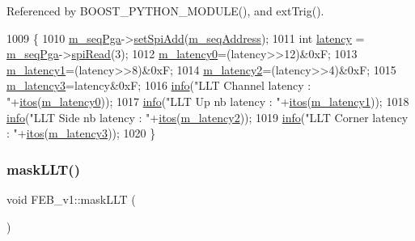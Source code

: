 Referenced by B\+O\+O\+S\+T\+\_\+\+P\+Y\+T\+H\+O\+N\+\_\+\+M\+O\+D\+U\+L\+E(), and ext\+Trig().


\begin{DoxyCode}
1009                        \{
1010   \hyperlink{classFEB__v1_a6c7804ac86796f233a8393043adf2e77}{m\_seqPga}->\hyperlink{classSeqPGA_ac998ce3a6d9b5f2e88cc8393f8c1df53}{setSpiAdd}(\hyperlink{classFEB__v1_a1c1eb093fd1733b9510fcf8bc5c7ad08}{m\_seqAddress});
1011   \textcolor{keywordtype}{int} \hyperlink{classFEB__v1_a68050d232efd8d6568910b09a2c18f62}{latency} = \hyperlink{classFEB__v1_a6c7804ac86796f233a8393043adf2e77}{m\_seqPga}->\hyperlink{classSeqPGA_ab3d0e5e5d4014bc7a92588a76b8713d4}{spiRead}(3);
1012   \hyperlink{classFEB__v1_a23a3d8bfbf96490890140f13b08a02c1}{m\_latency0}=(latency>>12)&0xF;
1013   \hyperlink{classFEB__v1_a026d2f4973bf3ddbc404e35264fdef1f}{m\_latency1}=(latency>>8)&0xF;
1014   \hyperlink{classFEB__v1_a2c4b18efd76de3bf7089bba57fb6744f}{m\_latency2}=(latency>>4)&0xF;
1015   \hyperlink{classFEB__v1_a2f71bdcef05c845177a62610da490bf9}{m\_latency3}=latency&0xF;
1016   \hyperlink{classObject_a644fd329ea4cb85f54fa6846484b84a8}{info}(\textcolor{stringliteral}{"LLT Channel latency : "}+\hyperlink{Tools_8h_af330027dbdafb9a30768b3613c553e60}{itos}(\hyperlink{classFEB__v1_a23a3d8bfbf96490890140f13b08a02c1}{m\_latency0}));
1017   \hyperlink{classObject_a644fd329ea4cb85f54fa6846484b84a8}{info}(\textcolor{stringliteral}{"LLT Up nb   latency : "}+\hyperlink{Tools_8h_af330027dbdafb9a30768b3613c553e60}{itos}(\hyperlink{classFEB__v1_a026d2f4973bf3ddbc404e35264fdef1f}{m\_latency1}));
1018   \hyperlink{classObject_a644fd329ea4cb85f54fa6846484b84a8}{info}(\textcolor{stringliteral}{"LLT Side nb latency : "}+\hyperlink{Tools_8h_af330027dbdafb9a30768b3613c553e60}{itos}(\hyperlink{classFEB__v1_a2c4b18efd76de3bf7089bba57fb6744f}{m\_latency2}));
1019   \hyperlink{classObject_a644fd329ea4cb85f54fa6846484b84a8}{info}(\textcolor{stringliteral}{"LLT Corner  latency : "}+\hyperlink{Tools_8h_af330027dbdafb9a30768b3613c553e60}{itos}(\hyperlink{classFEB__v1_a2f71bdcef05c845177a62610da490bf9}{m\_latency3}));
1020 \}
\end{DoxyCode}
\mbox{\label{classFEB__v1_a14807bfa77f92bb82428c39abea5df88}} 
\subsubsection{\texorpdfstring{mask\+L\+L\+T()}{maskLLT()}}
{\footnotesize\ttfamily void F\+E\+B\+\_\+v1\+::mask\+L\+LT (\begin{DoxyParamCaption}{ }\end{DoxyParamCaption})}



